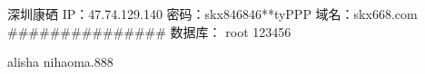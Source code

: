 深圳康硒
IP：47.74.129.140
密码：skx846846**tyPPP
域名：skx668.com
###############
数据库： root    123456


alisha nihaoma.888